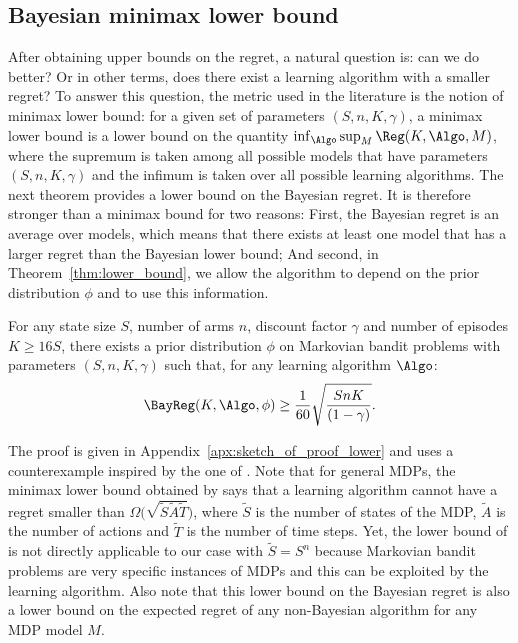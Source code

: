 \subsection{Bayesian minimax lower bound}
\label{ssec:lowerbound}

After obtaining upper bounds on the regret, a natural question is: can we do better? Or in other terms, does there exist a learning algorithm with a smaller regret? To answer this question, the metric used in the literature is the notion of minimax lower bound: for a given set of parameters $(S,n,K,\gamma)$, a minimax lower bound is a lower bound on the quantity 
$\inf_{\Algo}\sup_{M}\Reg(K,\Algo,M)$,  where the supremum is taken among all possible models that have parameters $(S,n,K,\gamma)$ and the infimum is taken over all possible learning algorithms. The next theorem provides a lower bound on the Bayesian regret. It is therefore stronger than a minimax bound for two reasons: First, the Bayesian regret is an average over models, which means that there exists at least one model that has a larger regret than the Bayesian lower bound; And second,  in Theorem~\ref{thm:lower_bound}, we allow the algorithm to depend on the prior distribution $\phi$ and to use this information.
\begin{thm}
    \label{thm:lower_bound}
    For any state size $S$, number of arms $n$, discount factor $\gamma$ and number of episodes $K\ge 16S$, there exists a prior distribution $\phi$ on Markovian bandit problems with parameters $(S,n,K,\gamma)$ such that, for any learning algorithm $\Algo$:
    \begin{align}
        \label{eq:thm2}
        \BayReg(K,\Algo,\phi) \geq \frac1{60}\sqrt{\frac{{SnK}}{(1-\gamma)}}.
    \end{align}
\end{thm}
The proof is given in Appendix~\ref{apx:sketch_of_proof_lower} and uses a counterexample inspired by the one of \cite{jaksch2010near}. Note that for general MDPs, the minimax lower bound  obtained by \cite{osband2016lower,jaksch2010near} says that a learning algorithm cannot have a regret smaller than $\Omega\big(\sqrt{\tilde{S}\tilde{A}\tilde{T}}\big)$, where $\tilde{S}$ is the number of states of the MDP, $\tilde{A}$ is the number of actions and $\tilde{T}$ is the number of time steps. 
Yet, the lower bound of \cite{osband2016lower,jaksch2010near} is not  directly applicable to our case with $\tilde{S}=S^n$ because Markovian bandit problems are very specific instances of MDPs and this can be exploited by the  learning algorithm.
Also note that this lower bound on the Bayesian regret is also a lower bound on the expected regret of any non-Bayesian algorithm for any MDP model $M$.

